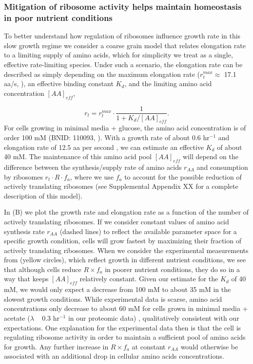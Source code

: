 \subsubsection{Mitigation of ribosome activity helps maintain homeostasis in
poor nutrient conditions}

To better understand how regulation of ribosomes influence growth rate in this
slow growth regime  we consider a coarse grain model that relates elongation
rate to a limiting supply of amino acids, which for simplicity we treat as a
single, effective rate-limiting species. Under such a scenario, the elongation
rate can be described as simply depending on the maximum elongation rate
($r_t^{max} \approx$ 17.1 aa/s, \citep{dai2016, dai2018}), an effective binding
constant $K_d$, and the limiting amino acid concentration $[AA]_{eff}$,

\begin{equation}
r_t = r_t^{max} \cdot \frac{1}{1 + K_d / [AA]_{eff}}.
\label{eq:rate_Kd}
\end{equation}
For cells growing in minimal media + glucose, the amino acid concentration is of
order 100 mM  (BNID: 110093, \citep{milo2010, bennett2009}). With a growth rate
of about 0.6 hr$^{-1}$ and elongation rate of 12.5 aa per second
\citep{dai2016}, we can estimate an effective $K_d$ of about 40 mM. The
maintenance of this amino acid pool $[AA]_{eff}$ will depend on the difference
between the synthesis/supply rate of amino acids $r_{AA}$ and consumption by
ribosomes $r_t \cdot R \cdot f_a$, where we use $f_a$ to account for the
possible reduction of actively translating ribosomes (see Supplemental Appendix
XX for a complete description of this model).

In (B) we plot the growth rate and elongation rate
as a function of the number of actively translating ribosomes. If we consider
constant values of amino acid synthesis rate $r_{AA}$ (dashed lines) to reflect
the available parameter space for a specific growth condition, cells will grow
fastest by maximizing their fraction of actively translating ribosomes. When we
consider the experimental measurements from \cite{dai2018} (yellow circles),
which reflect growth in different nutrient conditions, we see that although
cells reduce $R \times f_a$ in poorer nutrient conditions, they do so in a way
that keeps $[AA]_{eff}$ relatively constant. Given our estimate for the $K_d$ of
40 mM,  we would only expect a decrease from 100 mM to about 35 mM in the
slowest growth conditions. While experimental data is scarse, amino acid
concentrations only decrease to about 60 mM for cells grown in minimal media +
acetate ($\lambda$ ~ 0.3 hr$^{-1}$ in our proteomic data) \citep{bennett2009},
qualitatively consistent with our expectations.  One explanation for the
experimental data then  is that the cell is regulating ribosome activity in
order to maintain a sufficient pool of amino acids for growth. Any further
increase in $R \times f_a$ at constant $r_{AA}$ would otherwise be associated
with an additional drop in cellular amino acids concentrations.


